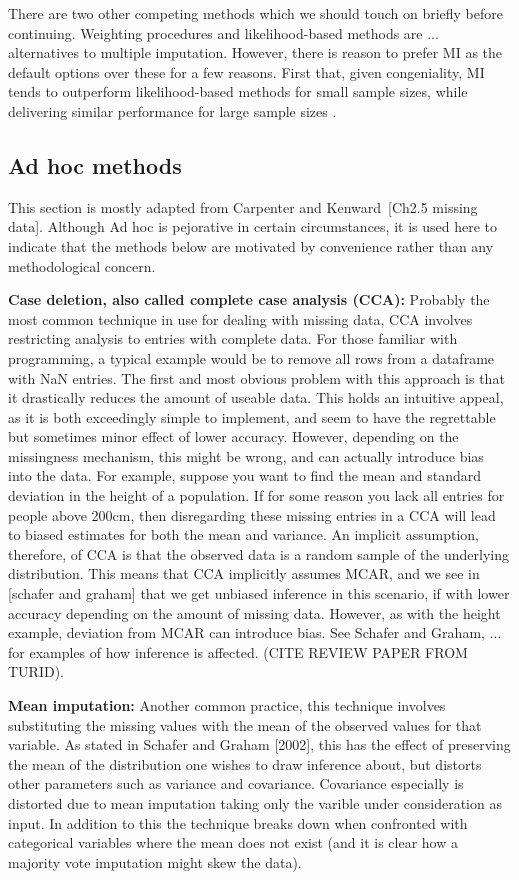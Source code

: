 \documentclass{article}
\begin{document}
	There are two other competing methods which we should touch on briefly before continuing. Weighting procedures and likelihood-based methods are ... alternatives to multiple imputation. However, there is reason to prefer MI as the default options over these for a few reasons. First that, given congeniality, MI tends to outperform likelihood-based methods for small sample sizes, while delivering similar performance for large sample sizes \cite{schafer_multiple_2016}.
	
	\subsection{Ad hoc methods}
	This section is mostly adapted from Carpenter and Kenward [Ch2.5 missing data]. Although Ad hoc is pejorative in certain circumstances, it is used here to indicate that the methods below are motivated by convenience rather than any methodological concern.
	
	\textbf{Case deletion, also called complete case analysis (CCA):}
	Probably the most common technique in use for dealing with missing data, CCA involves restricting analysis to entries with complete data. For those familiar with programming, a typical example would be to remove all rows from a dataframe with NaN entries. The first and most obvious problem with this approach is that it drastically reduces the amount of useable data. This holds an intuitive appeal, as it is both exceedingly simple to implement, and seem to have the regrettable but sometimes minor effect of lower accuracy. However, depending on the missingness mechanism, this might be wrong, and can actually introduce bias into the data. For example, suppose you want to find the mean and standard deviation in the height of a population. If for some reason you lack all entries for people above 200cm, then disregarding these missing entries in a CCA will lead to biased estimates for both the mean and variance. An implicit assumption, therefore, of CCA is that the observed data is a random sample of the underlying distribution. This means that CCA implicitly assumes MCAR, and we see in [schafer and graham] that we get unbiased inference in this scenario, if with lower accuracy depending on the amount of missing data. However, as with the height example, deviation from MCAR can introduce bias. See Schafer and Graham, ... for examples of how inference is affected. (CITE REVIEW PAPER FROM TURID). 
	
	\textbf{Mean imputation:}
	Another common practice, this technique involves substituting the missing values with the mean of the observed values for that variable. As stated in Schafer and Graham [2002], this has the effect of preserving the mean of the distribution one wishes to draw inference about, but distorts other parameters such as variance and covariance. Covariance especially is distorted due to mean imputation taking only the varible under consideration as input. In addition to this the technique breaks down when confronted with categorical variables where the mean does not exist (and it is clear how a majority vote imputation might skew the data). %
	
\end{document}
